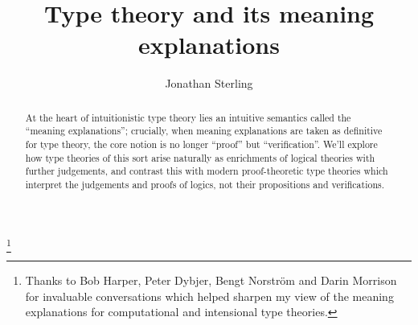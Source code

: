 \documentclass{amsbook}
\theoremstyle{definition}
\theoremstyle{remark}
\numberwithin{equation}{section}
\begin{document}
\title{Type theory and its meaning explanations}
\author{Jonathan Sterling}

\thanks{Thanks to Bob Harper, Peter Dybjer, Bengt Norstr\"om and Darin Morrison
for invaluable conversations which helped sharpen my view of the meaning
explanations for computational and intensional type theories.}


\maketitle

\begin{abstract}
  At the heart of intuitionistic type theory lies an intuitive semantics called
  the ``meaning explanations''; crucially, when meaning explanations are taken as
  definitive for type theory, the core notion is no longer ``proof'' but
  ``verification''. We'll explore how type theories of this sort arise naturally
  as enrichments of logical theories with further judgements, and contrast this
  with modern proof-theoretic type theories which interpret the judgements and
  proofs of logics, not their propositions and verifications.
\end{abstract}

\onehalfspacing

\tableofcontents




\end{document}
